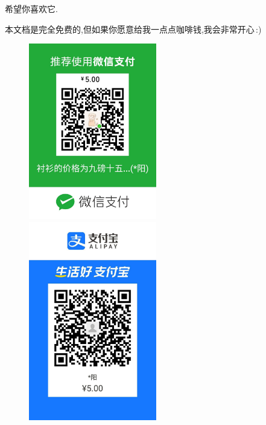 \documentclass{ctexart}
\numberwithin{equation}{subsection}
\begin{document}
\begin{center}
\Large        希望你喜欢它.
\end{center}
\begin{center}
       本文档是完全免费的,但如果你愿意给我一点点咖啡钱,我会非常开心\,:)
\end{center}
\begin{figure}
      \begin{minipage}[t]{0.5\linewidth}
       \centering
       \includegraphics[width=2.2in]{1.jpg}
      \end{minipage}%
       \begin{minipage}[t]{0.5\linewidth}
       \centering
       \includegraphics[width=2.2in]{2.jpg}
      \end{minipage}
       \end{figure}
\end{document}
